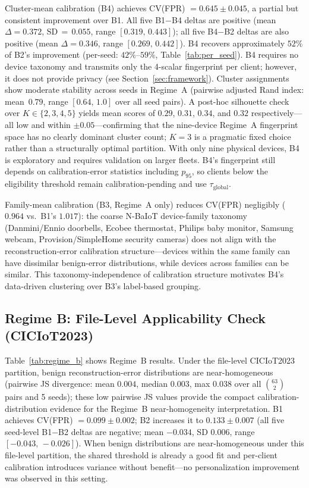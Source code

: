 Cluster-mean calibration (B4) achieves CV(FPR) $= 0.645 \pm 0.045$, a partial but consistent improvement over B1.
All five B1$-$B4 deltas are positive (mean $\Delta=0.372$, SD$\,{=}\,0.055$, range $[0.319,\,0.443]$);
all five B4$-$B2 deltas are also positive (mean $\Delta=0.346$, range $[0.269,\,0.442]$).
B4 recovers approximately $52\%$ of B2's improvement (per-seed: $42\%$--$59\%$, Table~\ref{tab:per_seed}).
B4 requires no device taxonomy and transmits only the 4-scalar fingerprint per client;
however, it does not provide privacy (see Section~\ref{sec:framework}).
Cluster assignments show moderate stability across seeds in Regime~A
(pairwise adjusted Rand index: mean~$0.79$, range $[0.64,\,1.0]$ over all seed pairs).
A post-hoc silhouette check over $K \in \{2,3,4,5\}$ yields mean scores of
$0.29$, $0.31$, $0.34$, and $0.32$ respectively---all low and within $\pm 0.05$---confirming
that the nine-device Regime~A fingerprint space has no clearly dominant cluster count;
$K{=}3$ is a pragmatic fixed choice rather than a structurally optimal partition.
With only nine physical devices, B4 is exploratory and requires validation on larger fleets.
B4's fingerprint still depends on calibration-error statistics including $p_{95}$, so
clients below the eligibility threshold remain calibration-pending and use
$\tau_{\text{global}}$.

Family-mean calibration (B3, Regime~A only) reduces CV(FPR) negligibly
($0.964$ vs.\ B1's $1.017$): the coarse N-BaIoT device-family taxonomy
(Danmini/Ennio doorbells, Ecobee thermostat, Philips baby monitor, Samsung webcam,
Provision/SimpleHome security cameras) does not align with the reconstruction-error
calibration structure---devices within the same family can have dissimilar
benign-error distributions, while devices across families can be similar.
This taxonomy-independence of calibration structure motivates B4's data-driven clustering
over B3's label-based grouping.

\subsection{Regime B: File-Level Applicability Check (CICIoT2023)}

Table~\ref{tab:regime_b} shows Regime~B results.
Under the file-level CICIoT2023 partition, benign reconstruction-error distributions are
near-homogeneous (pairwise JS divergence: mean $0.004$, median $0.003$, max $0.038$
over all $\binom{63}{2}$ pairs and 5 seeds); these low pairwise JS values provide the compact calibration-distribution evidence for the Regime~B near-homogeneity interpretation.
B1 achieves CV(FPR) $= 0.099 \pm 0.002$; B2 increases it to $0.133 \pm 0.007$
(all five seed-level B1$-$B2 deltas are negative; mean $-0.034$, SD $0.006$, range $[-0.043,\,-0.026]$).
When benign distributions are near-homogeneous under this file-level partition, the shared
threshold is already a good fit and per-client calibration introduces variance without
benefit---no personalization improvement was observed in this setting.

